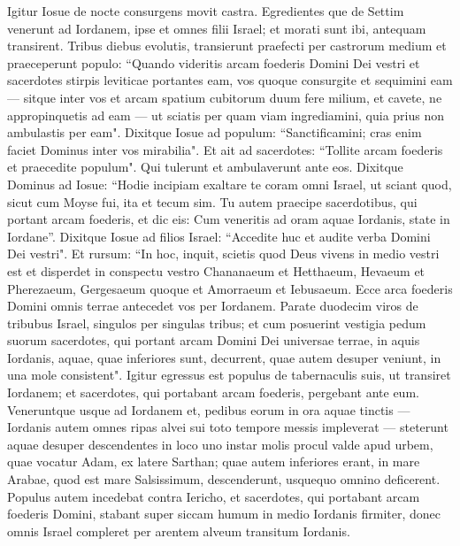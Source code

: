 \begin{biblechapter}  
\verse Igitur Iosue de nocte consurgens movit castra. Egredientes que de Settim venerunt ad Iordanem, ipse et omnes filii Israel; et morati sunt ibi, antequam transirent. 
\verse Tribus diebus evolutis, transierunt praefecti per castrorum medium 
\verse et praeceperunt populo: “Quando videritis arcam foederis Domini Dei vestri et sacerdotes stirpis leviticae portantes eam, vos quoque consurgite et sequimini eam 
\verse — sitque inter vos et arcam spatium cubitorum duum fere milium, et cavete, ne appropinquetis ad eam — ut sciatis per quam viam ingrediamini, quia prius non ambulastis per eam". 
\verse Dixitque Iosue ad populum: “Sanctificamini; cras enim faciet Dominus inter vos mirabilia". 
\verse Et ait ad sacerdotes: “Tollite arcam foederis et praecedite populum". Qui tulerunt et ambulaverunt ante eos. 
\verse Dixitque Dominus ad Iosue: “Hodie incipiam exaltare te coram omni Israel, ut sciant quod, sicut cum Moyse fui, ita et tecum sim. 
\verse Tu autem praecipe sacerdotibus, qui portant arcam foederis, et dic eis: Cum veneritis ad oram aquae Iordanis, state in Iordane”. 
\verse Dixitque Iosue ad filios Israel: “Accedite huc et audite verba Domini Dei vestri". 
\verse Et rursum: “In hoc, inquit, scietis quod Deus vivens in medio vestri est et disperdet in conspectu vestro Chananaeum et Hetthaeum, Hevaeum et Pherezaeum, Gergesaeum quoque et Amorraeum et Iebusaeum. 
\verse Ecce arca foederis Domini omnis terrae antecedet vos per Iordanem. 
\verse Parate duodecim viros de tribubus Israel, singulos per singulas tribus; 
\verse et cum posuerint vestigia pedum suorum sacerdotes, qui portant arcam Domini Dei universae terrae, in aquis Iordanis, aquae, quae inferiores sunt, decurrent, quae autem desuper veniunt, in una mole consistent". 
\verse Igitur egressus est populus de tabernaculis suis, ut transiret Iordanem; et sacerdotes, qui portabant arcam foederis, pergebant ante eum. 
\verse Veneruntque usque ad Iordanem et, pedibus eorum in ora aquae tinctis — Iordanis autem omnes ripas alvei sui toto tempore messis impleverat — 
\verse steterunt aquae desuper descendentes in loco uno instar molis procul valde apud urbem, quae vocatur Adam, ex latere Sarthan; quae autem inferiores erant, in mare Arabae, quod est mare Salsissimum, descenderunt, usquequo omnino deficerent. 
\verse Populus autem incedebat contra Iericho, et sacerdotes, qui portabant arcam foederis Domini, stabant super siccam humum in medio Iordanis firmiter, donec omnis Israel compleret per arentem alveum transitum Iordanis. 
\end{biblechapter}

